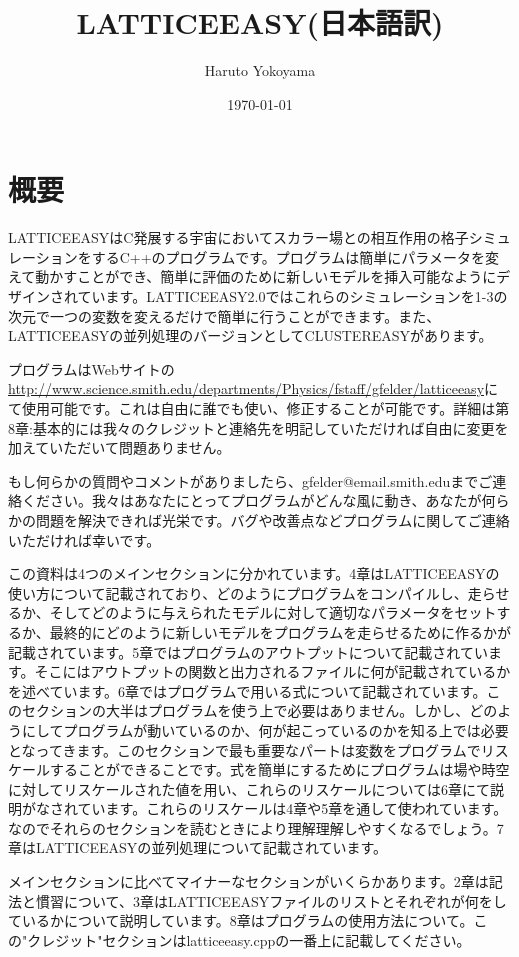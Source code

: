 \documentclass[dvipdfmx,11pt,a4paper]{jsbook}
\title{LATTICEEASY(日本語訳)}
\author{Haruto Yokoyama}
\date{\today}
\begin{document}
\maketitle

\tableofcontents

\makeatletter
{}
\def\theequation{\thesection.\arabic{equation}}
\makeatother

\chapter{概要}
LATTICEEASYはC発展する宇宙においてスカラー場との相互作用の格子シミュレーションをするC++のプログラムです。プログラムは簡単にパラメータを変えて動かすことができ、簡単に評価のために新しいモデルを挿入可能なようにデザインされています。LATTICEEASY2.0ではこれらのシミュレーションを1-3の次元で一つの変数を変えるだけで簡単に行うことができます。また、LATTICEEASYの並列処理のバージョンとしてCLUSTEREASYがあります。

プログラムはWebサイトの\url{http://www.science.smith.edu/departments/Physics/fstaff/gfelder/latticeeasy}にて使用可能です。これは自由に誰でも使い、修正することが可能です。詳細は第8章:基本的には我々のクレジットと連絡先を明記していただければ自由に変更を加えていただいて問題ありません。

もし何らかの質問やコメントがありましたら、gfelder@email.smith.eduまでご連絡ください。我々はあなたにとってプログラムがどんな風に動き、あなたが何らかの問題を解決できれば光栄です。バグや改善点などプログラムに関してご連絡いただければ幸いです。

この資料は4つのメインセクションに分かれています。4章はLATTICEEASYの使い方について記載されており、どのようにプログラムをコンパイルし、走らせるか、そしてどのように与えられたモデルに対して適切なパラメータをセットするか、最終的にどのように新しいモデルをプログラムを走らせるために作るかが記載されています。5章ではプログラムのアウトプットについて記載されています。そこにはアウトプットの関数と出力されるファイルに何が記載されているかを述べています。6章ではプログラムで用いる式について記載されています。このセクションの大半はプログラムを使う上で必要はありません。しかし、どのようにしてプログラムが動いているのか、何が起こっているのかを知る上では必要となってきます。このセクションで最も重要なパートは変数をプログラムでリスケールすることができることです。式を簡単にするためにプログラムは場や時空に対してリスケールされた値を用い、これらのリスケールについては6章にて説明がなされています。これらのリスケールは4章や5章を通して使われています。なのでそれらのセクションを読むときにより理解理解しやすくなるでしょう。7章はLATTICEEASYの並列処理について記載されています。

メインセクションに比べてマイナーなセクションがいくらかあります。2章は記法と慣習について、3章はLATTICEEASYファイルのリストとそれぞれが何をしているかについて説明しています。8章はプログラムの使用方法について。この"クレジット"セクションはlatticeeasy.cppの一番上に記載してください。





\end{document}
